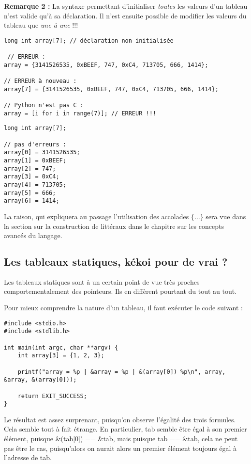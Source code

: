 \documentclass[../../../main.tex]{subfiles}
\begin{document}
\textbf{Remarque 2 :} La syntaxe permettant d'initialiser \textit{toutes} les valeurs d'un tableau n'est valide qu'à sa déclaration. Il n'est ensuite possible de modifier les valeurs du tableau que \textit{une à une} !!!  

\begin{minipage}{0.75\textwidth}
\begin{verbatim}
long int array[7]; // déclaration non initialisée

 // ERREUR :
array = {3141526535, 0xBEEF, 747, 0xC4, 713705, 666, 1414};

// ERREUR à nouveau :
array[7] = {3141526535, 0xBEEF, 747, 0xC4, 713705, 666, 1414}; 

// Python n'est pas C :
array = [i for i in range(7)]; // ERREUR !!!
\end{verbatim}
\end{minipage}
\begin{minipage}{0.25\textwidth}
\begin{verbatim}
long int array[7];

// pas d'erreurs :
array[0] = 3141526535;
array[1] = 0xBEEF;
array[2] = 747;
array[3] = 0xC4;
array[4] = 713705;
array[5] = 666;
array[6] = 1414;
\end{verbatim}
\end{minipage}
La raison, qui \og expliquera \fg au passage l'utilisation des accolades $\{\dots\}$ sera vue dans la section sur la construction de littéraux dans le chapitre sur les concepts avancés du langage.
\subsection{Les tableaux statiques, kékoi pour de vrai ?}
Les tableaux statiques sont à un certain point de vue très proches comportementalement des pointeurs. Ils en diffèrent pourtant du tout au tout.
 
Pour mieux comprendre la nature d'un tableau, il faut exécuter le code suivant :
\begin{verbatim}
#include <stdio.h>
#include <stdlib.h>

int main(int argc, char **argv) {
	int array[3] = {1, 2, 3};

	printf("array = %p | &array = %p | &(array[0]) %p\n", array, &array, &(array[0]));

	return EXIT_SUCCESS;
}
\end{verbatim}
Le résultat est assez surprenant, puisqu'on observe l'égalité des trois formules. Cela semble tout à fait étrange. En particulier, \textsf{tab} semble être égal à son premier élément, puisque \textsf{\&(tab[0]) == \&tab}, mais puisque \textsf{tab == \&tab}, cela ne peut pas être le cas, puisqu'alors on aurait alors un premier élément toujours égal à l'adresse de \textsf{tab}.
 
\end{document}
